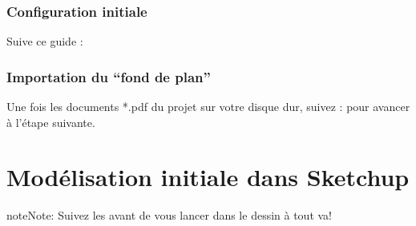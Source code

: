 \documentclass[a4paper,12pt,french]{sphinxmanual}
\begin{document}
\subsubsection{Configuration initiale}
\label{init_su+acad/demarrage:configuration-initiale}
Suive ce guide : {\hyperref[su/config\string-su::doc]{}}


\subsubsection{Importation du ``fond de plan''}
\label{init_su+acad/demarrage:init-su-acad-import-img-su}\label{init_su+acad/demarrage:importation-du-fond-de-plan}
Une fois les documents *.pdf du projet sur votre disque dur, suivez : {\hyperref[su/import\string-ssqu::doc]{}} pour avancer à l'étape suivante.


\section{Modélisation initiale dans Sketchup}
\label{init_su+acad/su1:modelisation-initiale-dans-su}\label{init_su+acad/su1::doc}\label{init_su+acad/su1:su1}
\begin{notice}{note}{Note:}
Suivez les {\hyperref[su/intro\string-su:notions\string-essentielles\string-su]{}} avant de vous lancer dans le dessin à tout va!
\end{notice}
\end{document}

